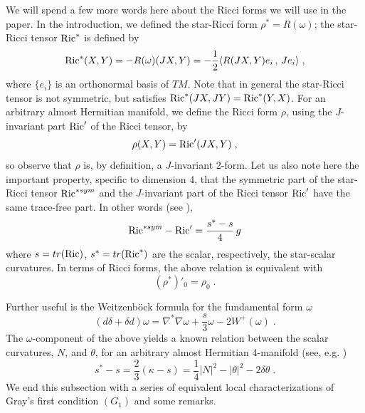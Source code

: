\documentclass{amsart}
\begin{document}
\noindent
We will spend a few more words here about the Ricci forms we will use in the paper. In the introduction, we defined the star-Ricci form $\rho^* = R(\omega)$; the star-Ricci tensor ${\rm Ric}^*$ is defined by
$${\rm Ric}^*(X,Y) = - R(\omega)(JX, Y) = - \frac{1}{2} \langle R(JX, Y)e_i \, , \, Je_i \rangle \; , $$
where $\{ e_i \}$ is an orthonormal basis of $TM$. Note that in general the star-Ricci tensor is not symmetric, but satisfies ${\rm Ric}^*(JX,JY) = {\rm Ric}^*(Y,X)$. For an arbitrary almost Hermitian manifold, we define the Ricci form $\rho$, using the $J$-invariant part ${\rm Ric}'$ of the Ricci tensor, by
$$ \rho(X,Y) = {\rm Ric}'(JX, Y) \; ,$$
so observe that $\rho$ is, by definition, a $J$-invariant 2-form. Let us also note here the important property, specific to dimension 4, that the symmetric part of the star-Ricci tensor ${\rm Ric}^{* sym}$ and the $J$-invariant part of the Ricci tensor ${\rm Ric}'$ have the same trace-free part. In other words (see \cite{TV}),
$$ {\rm Ric}^{* sym} - {\rm Ric}' = \frac{s^* - s}{4} \, g$$
where $ s = tr({\rm Ric})$, $s^* = tr({\rm Ric}^*) $ are the scalar, respectively, the star-scalar curvatures. In terms of Ricci forms, the above relation is equivalent with
$$ (\rho^*)'_0  = \rho_0 \; . $$






\vspace{0.2cm}

\noindent
Further useful is the Weitzenb\"ock formula for the fundamental form $\omega$
\begin{equation} \label{Weitz-om}
(d \delta + \delta d) \omega  = \nabla^* \nabla \omega + \frac{s}{3} \omega - 2W^+(\omega) \; .
\end{equation}
The $\omega$-component of the above yields a known relation between the scalar curvatures, $N$, and $\theta$, for an arbitrary almost Hermitian 4-manifold (see, e.g. \cite{Sek87})
\begin{equation} \label{kappa-s}
   s^* - s = \frac{2}{3}(\kappa - s) =  \frac{1}{4} |N|^2 - |\theta|^2 - 2 \delta \theta \; .
\end{equation}
We end this subsection with a series of equivalent local characterizations of Gray's first condition $(G_1)$ and some remarks.
\end{document}
